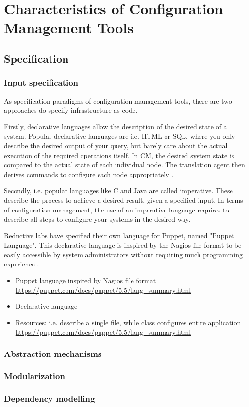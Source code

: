 \section{Characteristics of Configuration Management Tools}

\subsection{Specification}

\subsubsection{Input specification}


As specification paradigms of configuration management tools, there are two approaches do specify infrastructure as code. 

Firstly, declarative languages allow the description of the desired state of a system. Popular declarative languages are i.e. HTML or SQL, where you only describe the desired output of your query, but barely care about the actual execution of the required operations itself. In CM, the desired system state is compared to the actual state of each individual node. The translation agent then derives commands to configure each node appropriately \cite{delaet2010survey}.

Secondly, i.e. popular languages like C and Java are called imperative. These describe the process to achieve a desired result, given a specified input. In terms of configuration management, the use of an imperative language requires to describe all steps to configure your systems in the desired way.



Reductive labs have specified their own language for Puppet, named "Puppet Language". This declarative language is inspired by the Nagios file format to be easily accessible by system administrators without requiring much programming experience \cite{puppetcomlangsum}.

\begin{itemize}
	\item Puppet language inspired by Nagios file format \url{https://puppet.com/docs/puppet/5.5/lang_summary.html}
	\item Declarative language \cite{pandey2012investigating}
	\item Resources: i.e. describe a single file, while class configures entire application \url{https://puppet.com/docs/puppet/5.5/lang_summary.html}
\end{itemize}



\subsubsection{Abstraction mechanisms}

\subsubsection{Modularization}

\subsubsection{Dependency modelling}
